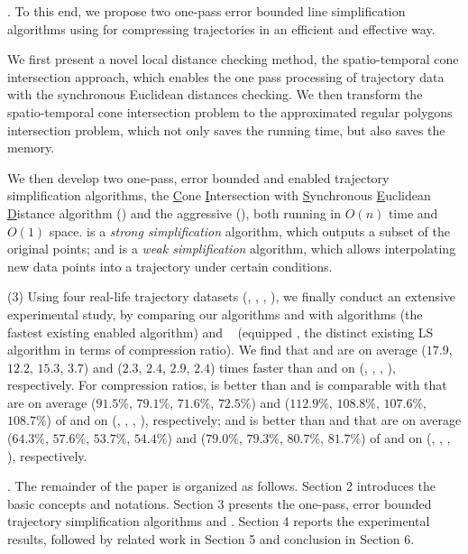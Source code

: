 .
To this end, we propose two one-pass error bounded line simplification algorithms using \sed for compressing trajectories in an efficient and effective way.

 We first present a novel local distance checking method, \ie the spatio-temporal cone intersection approach, which enables the one pass processing of trajectory data with the synchronous Euclidean distances checking. We then transform the spatio-temporal cone intersection problem to the approximated regular polygons intersection problem, which not only saves the running time, but also saves the memory.

 We then develop two one-pass, error bounded and \sed enabled trajectory simplification algorithms, \ie the \underline{C}one \underline{I}ntersection with \underline{S}ynchronous \underline{E}uclidean \underline{D}istance algorithm (\cist) and the aggressive \cist (\cista), both running in $O(n)$ time and $O(1)$ space.
\cist is a \emph{strong simplification}\cite{Trajcevski:DDR} algorithm, which outputs a subset of the original points;
and \cista is a \emph{weak simplification}\cite{Trajcevski:DDR} algorithm, which allows interpolating new data points into a trajectory under certain
conditions.


\stab (3) Using four real-life trajectory datasets (\truck, \sercar, \geolife, \pricar),
we finally conduct an extensive experimental study, by comparing our algorithms \cist and \cista with algorithms \squishe \cite{Muckell:Compression} (the \textcolor[rgb]{1.00,0.00,0.00}{fastest} existing \sed enabled \lsa algorithm) and \dps~\cite{Meratnia:Spatiotemporal} (\sed equipped \dpa, the distinct existing LS algorithm in terms of compression ratio).
%
We find that \cist and \cista are on average ($17.9$, $12.2$, $15.3$, \textcolor[rgb]{1.00,0.00,0.00}{{$3.7$}}) and ($2.3$, $2.4$, $2.9$, {$2.4$}) times faster than \dps and \squishe on (\truck, \sercar, \geolife, \pricar), respectively.
%
For compression ratios, \cist is better than \squishe and is comparable with \dps that are on average ($91.5\%$, $79.1\%$, $71.6\%$, {$72.5\%$}) and ($112.9\%$, $108.8\%$, $107.6\%$, $108.7\%$) of \squishe and \dps on (\truck, \sercar, \geolife, \pricar), respectively; and \cista is better than \squishe and \dps that are on average ($64.3\%$, $57.6\%$, $53.7\%$, {$54.4\%$}) and ($79.0\%$, $79.3\%$, $80.7\%$, $81.7\%$) of \squishe and \dps on (\truck, \sercar, \geolife, \pricar), respectively.


.
The remainder of the paper is organized as follows.
Section 2 introduces the basic concepts and notations.
Section 3 presents the one-pass, error bounded trajectory simplification algorithms \cist and \cista.
Section 4 reports the experimental results, followed by related work in
Section 5 and conclusion in Section 6.







